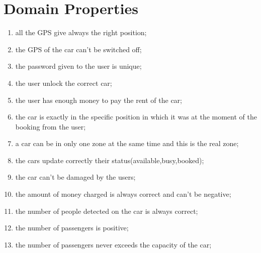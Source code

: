 \section{Domain Properties}
\begin{enumerate}
	\item all the GPS give always the right position;
	\item the GPS of the car can't be switched off;
	\item the password given to the user is unique;
	\item the user unlock the correct car;
	\item the user has enough money to pay the rent of the car;
	\item the car is exactly in the specific position in which it was at the moment of the booking from the user;
	\item a car can be in only one zone at the same time and this is the real zone;
	\item the cars update correctly their status(available,busy,booked);
    \item the car can't be damaged by the users;
    \item the amount of money charged is always correct and can't be negative;
    \item the number of people detected on the car is always correct;
    \item the number of passengers is positive;
    \item the number of passengers never exceeds the capacity of the car;

    
  
   
    
\end{enumerate}
